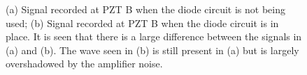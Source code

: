 \begin{figure}[ht!]
\begin{subfigmatrix}{2}
\end{subfigmatrix}

  \caption
  { \label{fig:diodeCircuitResults}
(a) Signal recorded at PZT B when the diode circuit is not being used;
(b) Signal recorded at PZT B when the diode circuit is in place. It is seen that there is a large difference between the signals in (a) and (b). The wave seen in (b) is still present in (a) but is largely overshadowed by the amplifier noise.
}
\end{figure}

